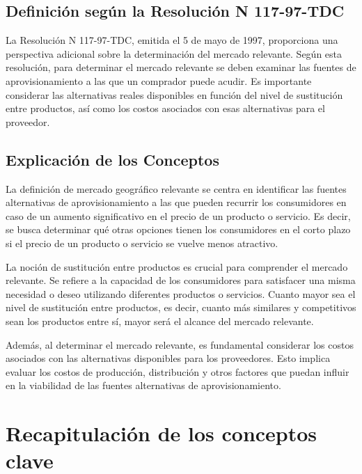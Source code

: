 \documentclass[
  a4paper,
]{article}
\theoremstyle{definition}
\theoremstyle{remark}
\begin{document}
\hypertarget{definiciuxf3n-seguxfan-la-resoluciuxf3n-n-117-97-tdc}{%
\subsection{Definición según la Resolución N
117-97-TDC}\label{definiciuxf3n-seguxfan-la-resoluciuxf3n-n-117-97-tdc}}

La Resolución N 117-97-TDC, emitida el 5 de mayo de 1997, proporciona
una perspectiva adicional sobre la determinación del mercado relevante.
Según esta resolución, para determinar el mercado relevante se deben
examinar las fuentes de aprovisionamiento a las que un comprador puede
acudir. Es importante considerar las alternativas reales disponibles en
función del nivel de sustitución entre productos, así como los costos
asociados con esas alternativas para el proveedor.

\hypertarget{explicaciuxf3n-de-los-conceptos}{%
\subsection{Explicación de los
Conceptos}\label{explicaciuxf3n-de-los-conceptos}}

La definición de mercado geográfico relevante se centra en identificar
las fuentes alternativas de aprovisionamiento a las que pueden recurrir
los consumidores en caso de un aumento significativo en el precio de un
producto o servicio. Es decir, se busca determinar qué otras opciones
tienen los consumidores en el corto plazo si el precio de un producto o
servicio se vuelve menos atractivo.

La noción de sustitución entre productos es crucial para comprender el
mercado relevante. Se refiere a la capacidad de los consumidores para
satisfacer una misma necesidad o deseo utilizando diferentes productos o
servicios. Cuanto mayor sea el nivel de sustitución entre productos, es
decir, cuanto más similares y competitivos sean los productos entre sí,
mayor será el alcance del mercado relevante.

Además, al determinar el mercado relevante, es fundamental considerar
los costos asociados con las alternativas disponibles para los
proveedores. Esto implica evaluar los costos de producción, distribución
y otros factores que puedan influir en la viabilidad de las fuentes
alternativas de aprovisionamiento.

\hypertarget{recapitulaciuxf3n-de-los-conceptos-clave}{%
\section{Recapitulación de los conceptos
clave}\label{recapitulaciuxf3n-de-los-conceptos-clave}}
\end{document}
